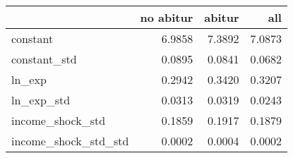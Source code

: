 \begin{tabular}{lrrr}
\toprule
 & no abitur & abitur & all \\
\midrule
constant & 6.9858 & 7.3892 & 7.0873 \\
constant_std & 0.0895 & 0.0841 & 0.0682 \\
ln_exp & 0.2942 & 0.3420 & 0.3207 \\
ln_exp_std & 0.0313 & 0.0319 & 0.0243 \\
income_shock_std & 0.1859 & 0.1917 & 0.1879 \\
income_shock_std_std & 0.0002 & 0.0004 & 0.0002 \\
\bottomrule
\end{tabular}
